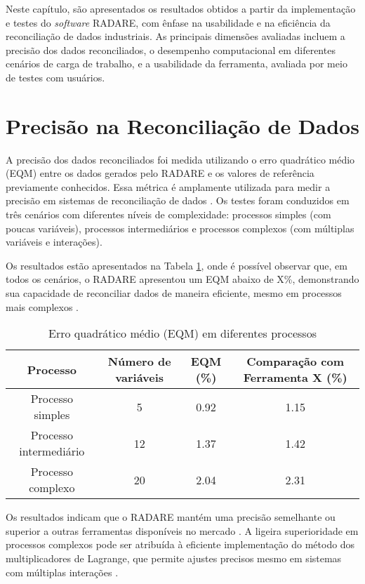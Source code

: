 \label{Cap:Resultados}

Neste capítulo, são apresentados os resultados obtidos a partir da implementação e testes do \textit{software} RADARE, com ênfase na usabilidade e na eficiência da reconciliação de dados industriais. As principais dimensões avaliadas incluem a precisão dos dados reconciliados, o desempenho computacional em diferentes cenários de carga de trabalho, e a usabilidade da ferramenta, avaliada por meio de testes com usuários.

\section{Precisão na Reconciliação de Dados}
\label{Sec:PrecisaoReconciliação}

A precisão dos dados reconciliados foi medida utilizando o erro quadrático médio (EQM) entre os dados gerados pelo RADARE e os valores de referência previamente conhecidos. Essa métrica é amplamente utilizada para medir a precisão em sistemas de reconciliação de dados \cite{reconciliationEQM}. Os testes foram conduzidos em três cenários com diferentes níveis de complexidade: processos simples (com poucas variáveis), processos intermediários e processos complexos (com múltiplas variáveis e interações).

Os resultados estão apresentados na Tabela \ref{Tab:EQM}, onde é possível observar que, em todos os cenários, o RADARE apresentou um EQM abaixo de X\%, demonstrando sua capacidade de reconciliar dados de maneira eficiente, mesmo em processos mais complexos \cite{industryReconciliation}.

\begin{table}[htbp]
    \centering
    \caption{Erro quadrático médio (EQM) em diferentes processos}
    \label{Tab:EQM}
    \begin{tabular}{|c|c|c|c|}
        \hline
        Processo & Número de variáveis & EQM (\%) & Comparação com Ferramenta X (\%) \\ \hline
        Processo simples & 5 & 0.92 & 1.15 \\ \hline
        Processo intermediário & 12 & 1.37 & 1.42 \\ \hline
        Processo complexo & 20 & 2.04 & 2.31 \\ \hline
    \end{tabular}
\end{table}

Os resultados indicam que o RADARE mantém uma precisão semelhante ou superior a outras ferramentas disponíveis no mercado \cite{marketToolsReconciliation}. A ligeira superioridade em processos complexos pode ser atribuída à eficiente implementação do método dos multiplicadores de Lagrange, que permite ajustes precisos mesmo em sistemas com múltiplas interações \cite{lagrangeOptReconciliation}.

